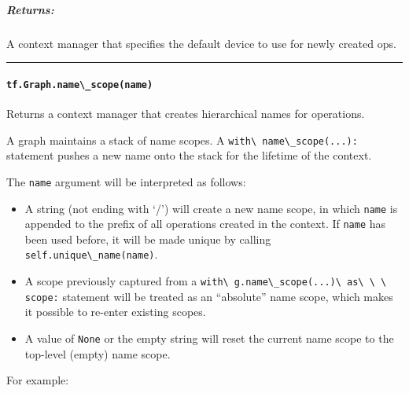 \subparagraph{Returns: }\label{returns-3}

A context manager that specifies the default device to use for newly
created ops.

\begin{center}\rule{0.5\linewidth}{\linethickness}\end{center}

\paragraph{\texorpdfstring{\lstinline{tf.Graph.name\_scope(name)}
}{tf.Graph.name\_scope(name) }}\label{tf.graph.nameux5fscopename}

Returns a context manager that creates hierarchical names for
operations.

A graph maintains a stack of name scopes. A
\lstinline{with\ name\_scope(...):} statement pushes a new name onto the
stack for the lifetime of the context.

The \lstinline{name} argument will be interpreted as follows:

\begin{itemize}
\tightlist
\item
  A string (not ending with `/') will create a new name scope, in which
  \lstinline{name} is appended to the prefix of all operations created in
  the context. If \lstinline{name} has been used before, it will be made
  unique by calling \lstinline{self.unique\_name(name)}.
\item
  A scope previously captured from a
  \lstinline{with\ g.name\_scope(...)\ as\ \ \ scope:} statement will be
  treated as an ``absolute'' name scope, which makes it possible to
  re-enter existing scopes.
\item
  A value of \lstinline{None} or the empty string will reset the current
  name scope to the top-level (empty) name scope.
\end{itemize}

For example:


